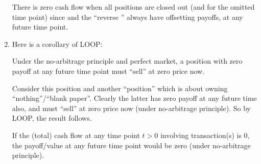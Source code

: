 \begin{enumerate}
\begin{pf}
There is zero cash flow when all positions are closed out (and for the omitted
time point) since {\color{ForestGreen}} and the ``reverse
{\color{red}}'' always have offsetting payoffs, at any future
time point.
\end{pf}

\item Here is a corollary of LOOP:
\begin{corollary}
\label{cor:zero-payoff-zero-price}
Under the no-arbitrage principle and perfect market, a position 
with zero payoff at any future time point must ``sell'' at zero price now.
\end{corollary}
\begin{pf}
Consider this position  and another ``position'' which is about
owning ``nothing''/``blank paper''. Clearly the latter has zero payoff at any
future time also, and must ``sell'' at zero price now (under no-arbitrage
principle).  So by LOOP, the result follows.
\end{pf}

\begin{note}
If the (total) cash flow at any time point \(t>0\) involving transaction(s) is
0, the payoff/value at any future time point would be zero (under no-arbitrage
principle).
\end{note}
\end{enumerate}
